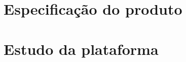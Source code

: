 \documentclass{normas-utf-tex_07_2012} %
\numberwithin{equation}{chapter} %
\begin{document}
\chapter{Especificação do produto} \label{cap:especificacao_produto}



\chapter{Estudo da plataforma} \label{cap:estudo_plataforma}





% 

% 
\end{document}
